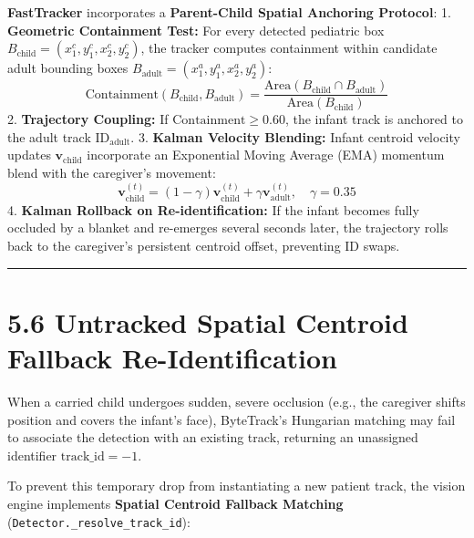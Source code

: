 \textbf{FastTracker} incorporates a \textbf{Parent-Child Spatial
Anchoring Protocol}: 1. \textbf{Geometric Containment Test:} For every
detected pediatric box
\(B_{\text{child}} = (x_1^c, y_1^c, x_2^c, y_2^c)\), the tracker
computes containment within candidate adult bounding boxes
\(B_{\text{adult}} = (x_1^a, y_1^a, x_2^a, y_2^a)\):
\[\text{Containment}(B_{\text{child}}, B_{\text{adult}}) = \frac{\text{Area}(B_{\text{child}} \cap B_{\text{adult}})}{\text{Area}(B_{\text{child}})}\]
2. \textbf{Trajectory Coupling:} If \(\text{Containment} \ge 0.60\), the
infant track is anchored to the adult track
\(\text{ID}_{\text{adult}}\). 3. \textbf{Kalman Velocity Blending:}
Infant centroid velocity updates \(\mathbf{v}_{\text{child}}\)
incorporate an Exponential Moving Average (EMA) momentum blend with the
caregiver's movement:
\[\mathbf{v}_{\text{child}}^{(t)} = (1 - \gamma) \mathbf{v}_{\text{child}}^{(t)} + \gamma \mathbf{v}_{\text{adult}}^{(t)}, \quad \gamma = 0.35\]
4. \textbf{Kalman Rollback on Re-identification:} If the infant becomes
fully occluded by a blanket and re-emerges several seconds later, the
trajectory rolls back to the caregiver's persistent centroid offset,
preventing ID swaps.

\begin{center}\rule{0.5\linewidth}{0.5pt}\end{center}

\section{5.6 Untracked Spatial Centroid Fallback
Re-Identification}\label{untracked-spatial-centroid-fallback-re-identification}

When a carried child undergoes sudden, severe occlusion (e.g., the
caregiver shifts position and covers the infant's face), ByteTrack's
Hungarian matching may fail to associate the detection with an existing
track, returning an unassigned identifier \(\text{track\_id} = -1\).

To prevent this temporary drop from instantiating a new patient track,
the vision engine implements \textbf{Spatial Centroid Fallback Matching}
(\texttt{Detector.\_resolve\_track\_id}):

